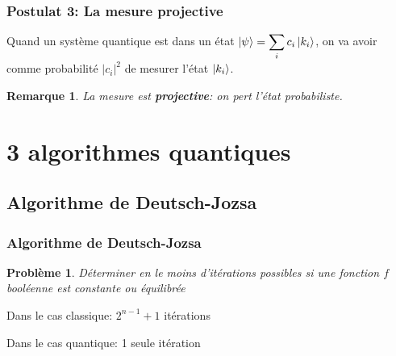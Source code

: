 \documentclass{beamer}
\newtheorem{pb}{Problème}
\newtheorem{rem}{Remarque}
\begin{document}
\begin{frame}
\frametitle{Postulat 3: La mesure projective}
\begin{definition}
  Quand un système quantique est dans un état $\ket{\psi} = \displaystyle\sum_{i} c_i \ket{k_i}$, on va avoir comme probabilité $|c_i|^2$ de mesurer l'état $\ket{k_i}$.
\end{definition}

\begin{rem}
  La mesure est \textbf{projective}: on pert l'état probabiliste.
\end{rem}


\end{frame}

\section{3 algorithmes quantiques}


\subsection{Algorithme de Deutsch-Jozsa}

\begin{frame}
\frametitle{Algorithme de Deutsch-Jozsa \cite{Deutsch92}}

\begin{pb}
  Déterminer en le moins d'itérations possibles si une fonction $f$ booléenne est constante ou équilibrée
\end{pb}

\medbreak
Dans le cas classique: $2^{n-1} + 1$ itérations

\medbreak
Dans le cas quantique: 1 seule itération

\end{frame}
\end{document}
